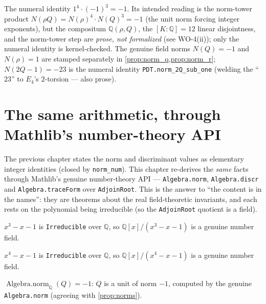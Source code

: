\begin{proposition}
  \label{prop:norms}
  \leanok
  The numeral identity $1^4\cdot(-1)^3 = -1$. Its intended reading is the norm-tower product
  $N(\rho Q) = N(\rho)^4\cdot N(Q)^3 = -1$ (the unit norm forcing integer exponents), but the
  compositum $\mathbb{Q}(\rho,Q)$, the $[K:\mathbb{Q}]=12$ linear disjointness, and the
  norm-tower step are \emph{prose, not formalized} (see WO-4(ii)); only the numeral identity is
  kernel-checked. The genuine field norms $N(Q)=-1$ and $N(\rho)=1$ are stamped separately in
  \cref{prop:norm_q,prop:norm_r}; $N(2Q-1)=-23$ is the numeral identity \lstinline{PDT.norm_2Q_sub_one}
  (welding the ``$23$'' to $E_4$'s $2$-torsion --- also prose).
\end{proposition}

\chapter{The same arithmetic, through Mathlib's number-theory API}

The previous chapter states the norm and discriminant values as elementary integer
identities (closed by \texttt{norm\_num}). This chapter re-derives the \emph{same} facts
through Mathlib's genuine number-theory API --- \texttt{Algebra.norm}, \texttt{Algebra.discr}
and \texttt{Algebra.traceForm} over \texttt{AdjoinRoot}. This is the answer to ``the content
is in the names'': they are theorems about the real field-theoretic invariants, and each
rests on the polynomial being irreducible (so the \texttt{AdjoinRoot} quotient is a field).

\begin{proposition}
  \label{prop:irred_c}
  \leanok
  $x^3-x-1$ is \texttt{Irreducible} over $\mathbb{Q}$, so $\mathbb{Q}[x]/(x^3-x-1)$ is a
  genuine number field.
\end{proposition}

\begin{proposition}
  \label{prop:irred_q}
  \leanok
  $x^4-x-1$ is \texttt{Irreducible} over $\mathbb{Q}$, so $\mathbb{Q}[x]/(x^4-x-1)$ is a
  genuine number field.
\end{proposition}

\begin{proposition}
  \label{prop:norm_q}
  \leanok
  $\operatorname{Algebra.norm}_{\mathbb{Q}}(Q) = -1$: $Q$ is a unit of norm $-1$, computed by
  the genuine \texttt{Algebra.norm} (agreeing with \cref{prop:norms}).
\end{proposition}


